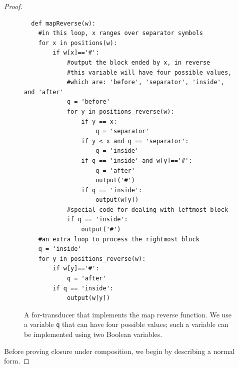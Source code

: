 \begin{proof}
\begin{figure}
\begin{lstlisting}
  def mapReverse(w):
    #in this loop, x ranges over separator symbols
    for x in positions(w):
        if w[x]=='#':
            #output the block ended by x, in reverse
            #this variable will have four possible values, 
            #which are: 'before', 'separator', 'inside', and 'after'
            q = 'before'
            for y in positions_reverse(w):
                if y == x:
                    q = 'separator'
                if y < x and q == 'separator':
                    q = 'inside'
                if q == 'inside' and w[y]=='#':
                    q = 'after'
                    output('#')
                if q == 'inside':
                    output(w[y])
            #special code for dealing with leftmost block
            if q == 'inside':
                output('#')
    #an extra loop to process the rightmost block
    q = 'inside'
    for y in positions_reverse(w):
        if w[y]=='#':
            q = 'after'
        if q == 'inside':
            output(w[y])       
\end{lstlisting}
\caption{\label{fig:map-reverse-for-transducer}
  A for-transducer that implements the map reverse function. We use a variable {\tt q} that can have four possible values; such a variable can be implemented using two Boolean variables.}
\end{figure}

Before proving closure under composition, we begin by describing a normal form.


\end{proof}
